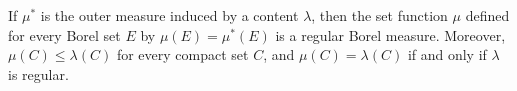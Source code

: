 If $\mu^*$ is the outer measure induced by a content $\lambda$, then the set function $\mu$ defined for every Borel set $E$ by $\mu(E) = \mu^*(E)$ is a regular Borel measure. Moreover, $\mu(C) \leq \lambda(C)$ for every compact set $C$, and $\mu(C) = \lambda(C)$ if and only if $\lambda$ is regular.
